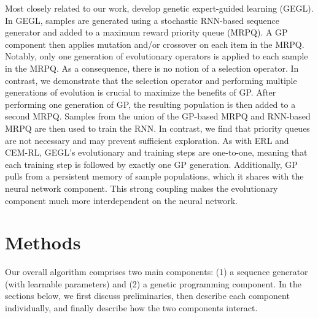 \documentclass{article}
\begin{document}
Most closely related to our work, \citet{ahn2020gprl} develop genetic expert-guided learning (GEGL).
In GEGL, samples are generated using a stochastic RNN-based sequence generator and added to a maximum reward priority queue (MRPQ).
A GP component then applies mutation and/or crossover on each item in the MRPQ.
Notably, only one generation of evolutionary operators is applied to each sample in the MRPQ.
As a consequence, there is no notion of a selection operator.
In contrast, we demonstrate that the selection operator and performing multiple generations of evolution is crucial to maximize the benefits of GP.
After performing one generation of GP, the resulting population is then added to a second MRPQ.
Samples from the union of the GP-based MRPQ and RNN-based MRPQ are then used to train the RNN.
In contrast, we find that priority queues are not necessary and may prevent sufficient exploration.
As with ERL and CEM-RL, GEGL's evolutionary and training steps are one-to-one, meaning that each training step is followed by exactly one GP generation.
Additionally, GP pulls from a persistent memory of sample populations, which it shares with the neural network component.
This strong coupling makes the evolutionary component much more interdependent on the neural network.

\section{Methods}

Our overall algorithm comprises two main components: (1) a sequence generator (with learnable parameters) and (2) a genetic programming component.
In the sections below, we first discuss preliminaries, then describe each component individually, and finally describe how the two components interact.
\end{document}
